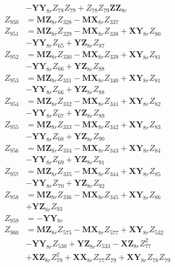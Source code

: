 \begin{multicols}{2}
\begin{align}
&- \mathbf{YY}_{8r}Z_{78}Z_{79} + Z_{78}Z_{79}\mathbf{ZZ}_{8r} \nonumber \\
Z_{950} &= \mathbf{MZ}_{8r}Z_{328} - \mathbf{MX}_{8r}Z_{337} \nonumber \\
Z_{951} &= \mathbf{MZ}_{8r}Z_{329} - \mathbf{MX}_{8r}Z_{338} + \mathbf{XY}_{8r}Z_{80}  \nonumber \\
&- \mathbf{YY}_{8r}Z_{65} + \mathbf{YZ}_{8r}Z_{87} \nonumber \\
Z_{952} &= \mathbf{MZ}_{8r}Z_{330} - \mathbf{MX}_{8r}Z_{339} + \mathbf{XY}_{8r}Z_{81}  \nonumber \\
&- \mathbf{YY}_{8r}Z_{66} + \mathbf{YZ}_{8r}Z_{88} \nonumber \\
Z_{953} &= \mathbf{MZ}_{8r}Z_{331} - \mathbf{MX}_{8r}Z_{340} + \mathbf{XY}_{8r}Z_{81}  \nonumber \\
&- \mathbf{YY}_{8r}Z_{66} + \mathbf{YZ}_{8r}Z_{88} \nonumber \\
Z_{954} &= \mathbf{MZ}_{8r}Z_{332} - \mathbf{MX}_{8r}Z_{341} + \mathbf{XY}_{8r}Z_{82}  \nonumber \\
&- \mathbf{YY}_{8r}Z_{67} + \mathbf{YZ}_{8r}Z_{89} \nonumber \\
Z_{955} &= \mathbf{MZ}_{8r}Z_{333} - \mathbf{MX}_{8r}Z_{342} + \mathbf{XY}_{8r}Z_{83}  \nonumber \\
&- \mathbf{YY}_{8r}Z_{68} + \mathbf{YZ}_{8r}Z_{90} \nonumber \\
Z_{956} &= \mathbf{MZ}_{8r}Z_{334} - \mathbf{MX}_{8r}Z_{343} + \mathbf{XY}_{8r}Z_{84}  \nonumber \\
&- \mathbf{YY}_{8r}Z_{69} + \mathbf{YZ}_{8r}Z_{91} \nonumber \\
Z_{957} &= \mathbf{MZ}_{8r}Z_{335} - \mathbf{MX}_{8r}Z_{344} + \mathbf{XY}_{8r}Z_{85}  \nonumber \\
&- \mathbf{YY}_{8r}Z_{70} + \mathbf{YZ}_{8r}Z_{92} \nonumber \\
Z_{958} &= \mathbf{MZ}_{8r}Z_{336} - \mathbf{MX}_{8r}Z_{345} + \mathbf{XY}_{8r}Z_{86}  \nonumber \\
&+ \mathbf{YZ}_{8r}Z_{93} \nonumber \\
Z_{959} &= -\mathbf{YY}_{8r} \nonumber \\
Z_{960} &= \mathbf{MZ}_{8r}Z_{575} - \mathbf{MX}_{8r}Z_{577} + \mathbf{XY}_{8r}Z_{532}  \nonumber \\
&- \mathbf{YY}_{8r}Z_{530} + \mathbf{YZ}_{8r}Z_{533} - \mathbf{XZ}_{8r}Z_{77}^2  \nonumber \\
&+ \mathbf{XZ}_{8r}Z_{79}^2 + \mathbf{XX}_{8r}Z_{77}Z_{79} + \mathbf{XY}_{8r}Z_{78}Z_{79}  \nonumber \\

\end{align}
\end{multicols}
